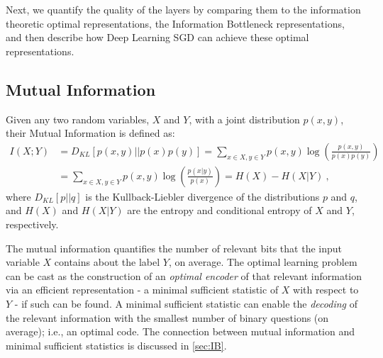 \documentclass[11pt]{article}
\newcommand{\ignore}[1]{}
\begin{document}
\ignore{ We argue here that SGD works in very different ways during the two distinct phases of the optimization process, both are critical for the success of Deep Learning. During the first phase, which lasts in our experiments a few hundred epochs, the noisy gradient has a narrow distribution around the true training error gradient, and the error decreases rapidly. In the second phase, for thousands additional epochs, the gradient distribution width is much larger than it's mean and the SGD induces random perturbations which maximizes the entropy of the weights distribution, for every hidden layer. 
This random walk, or stochastic relaxation process, \ravidcomment{ I think we need to explain these terms somewhere} converge to a different (special) distribution for each hidden layer, and each layer forms a different efficient representation of the input variable.}
 
Next, we quantify the quality of the layers by comparing them to the information theoretic optimal representations, the Information Bottleneck representations, and then describe how Deep Learning SGD can achieve these optimal representations. 

\subsection{Mutual Information}
Given any two random variables, $X$ and $Y$, with a joint distribution $p(x,y)$, their Mutual Information is defined as:
\begin{align}
I(X;Y) & = D_{KL}[p(x,y)||p(x)p(y)] = \sum_{x\in X, y\in Y} p(x,y) \log\left(\frac{p\left(x,y\right)}{p\left(x\right)p\left(y\right)}\right)\\
 & = \sum_{x\in X, y\in Y}p\left(x,y\right)\log\left(\frac{p\left(x|y\right)}{p\left(x\right)}\right)
 = H(X)-H(X|Y) ~,
 \label{MI}
\end{align}
\normalsize
where $D_{KL}[p||q]$ is the Kullback-Liebler divergence of the distributions $p$ and $q$, and $H(X)$ and $H(X|Y)$ are the entropy and conditional entropy of $X$ and $Y$, respectively. 

The mutual information quantifies the number of relevant bits that the input variable $X$ contains about the label $Y$, on average. The optimal learning problem can be cast as the construction of an \textit{optimal encoder} of that relevant information via an efficient representation - a minimal sufficient statistic of $X$ with respect to $Y$ - if such can be found. A minimal sufficient statistic can enable the \textit{decoding} of the relevant information with the smallest number of  binary questions (on average);  i.e., an optimal code. The connection between mutual information and minimal sufficient statistics is discussed in \ref{sec:IB}.
\end{document}

